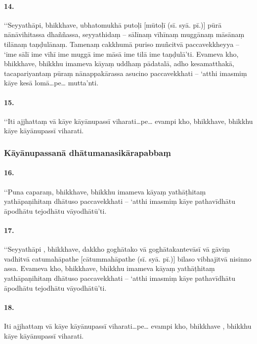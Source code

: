 \paragraph{14.} ‘‘Seyyathāpi, bhikkhave, ubhatomukhā putoḷi [mūtoḷī (sī. syā. pī.)] pūrā nānāvihitassa dhaññassa, seyyathidaṃ – sālīnaṃ vīhīnaṃ muggānaṃ māsānaṃ tilānaṃ taṇḍulānaṃ. Tamenaṃ cakkhumā puriso muñcitvā paccavekkheyya – ‘ime sālī ime vīhī ime muggā ime māsā ime tilā ime taṇḍulā’ti. Evameva kho, bhikkhave, bhikkhu imameva kāyaṃ uddhaṃ pādatalā, adho kesamatthakā, tacapariyantaṃ pūraṃ nānappakārassa asucino paccavekkhati – ‘atthi imasmiṃ kāye kesā lomā…pe… mutta’nti.

\paragraph{15.} ‘‘Iti ajjhattaṃ vā kāye kāyānupassī viharati…pe… evampi kho, bhikkhave, bhikkhu kāye kāyānupassī viharati.


\subsubsection{Kāyānupassanā dhātumanasikārapabbaṃ}

\paragraph{16.} ‘‘Puna caparaṃ, bhikkhave, bhikkhu imameva kāyaṃ yathāṭhitaṃ yathāpaṇihitaṃ dhātuso paccavekkhati – ‘atthi imasmiṃ kāye pathavīdhātu āpodhātu tejodhātu vāyodhātū’ti.

\paragraph{17.} ‘‘Seyyathāpi , bhikkhave, dakkho goghātako vā goghātakantevāsī vā gāviṃ vadhitvā catumahāpathe [cātummahāpathe (sī. syā. pī.)] bilaso vibhajitvā nisinno assa. Evameva kho, bhikkhave, bhikkhu imameva kāyaṃ yathāṭhitaṃ yathāpaṇihitaṃ dhātuso paccavekkhati – ‘atthi imasmiṃ kāye pathavīdhātu āpodhātu tejodhātu vāyodhātū’ti.

\paragraph{18.} Iti ajjhattaṃ vā kāye kāyānupassī viharati…pe… evampi kho, bhikkhave , bhikkhu kāye kāyānupassī viharati.

